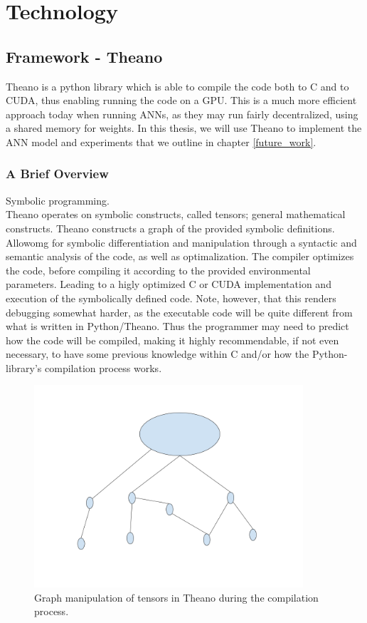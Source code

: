 
\chapter{Technology}
\section{Framework - Theano}

Theano is a python library which is able to compile the code both to C and to CUDA, thus enabling running the code on a GPU. This is a much more efficient approach today when running ANNs, as they may run fairly decentralized, using a shared memory for weights. In this thesis, we will use Theano to implement the ANN model and experiments that we outline in chapter \ref{future_work}.

\subsection{A Brief Overview}

Symbolic programming.
\\
Theano operates on symbolic constructs, called tensors; general mathematical constructs. Theano constructs a graph of the provided symbolic definitions. Allowomg for symbolic differentiation and manipulation through a syntactic and semantic analysis of the code, as well as optimalization. The compiler optimizes the code, before compiling it according to the provided environmental parameters. Leading to a higly optimized C or CUDA implementation and execution of the symbolically defined code.
Note, however, that this renders debugging somewhat harder, as the executable code will be quite different from what is written in Python/Theano. Thus the programmer may need to predict how the code will be compiled, making it highly recommendable, if not even necessary, to have some previous knowledge within C and/or how the Python-library's compilation process works.

\begin{figure}
\centering
\includegraphics[width=10cm]{fig/dummy_theano_graph}
\caption{Graph manipulation of tensors in Theano during the compilation process.}
\label{fig:graph_manipulation_theano}
\end{figure}

